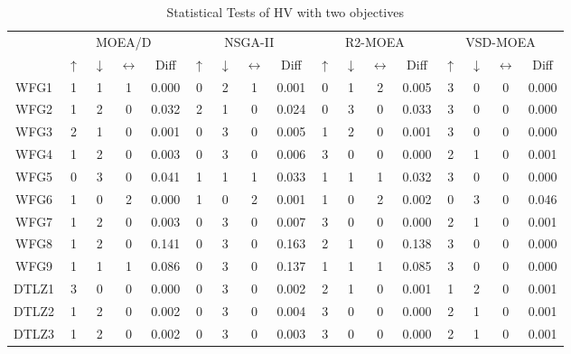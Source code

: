 \begin{table*}[t]
\caption{Statistical Tests of HV with two objectives}
\label{tab:Tests_HV_2obj}
\centering
\begin{tabular}{c|c|c|c|c|c|c|c|c|c|c|c|c|c|c|c|c|}
\cline{2-17}
 & \multicolumn{4}{c|}{MOEA/D} & \multicolumn{4}{c|}{NSGA-II} & \multicolumn{4}{c|}{R2-MOEA} & \multicolumn{4}{c|}{VSD-MOEA} \\ \cline{2-17} 
 & $\uparrow$ & $\downarrow$ & $\leftrightarrow$ & Diff & $\uparrow$ & $\downarrow$ & $\leftrightarrow$ & Diff & $\uparrow$ & $\downarrow$ & $\leftrightarrow$ & Diff & $\uparrow$ & $\downarrow$ & $\leftrightarrow$ & Diff \\ \hline
\multicolumn{1}{|c|}{WFG1} & 1 & 1 & 1 & 0.000 & 0 & 2 & 1 & 0.001 & 0 & 1 & 2 & 0.005 & 3 & 0 & 0 & 0.000 \\ \hline
\multicolumn{1}{|c|}{WFG2} & 1 & 2 & 0 & 0.032 & 2 & 1 & 0 & 0.024 & 0 & 3 & 0 & 0.033 & 3 & 0 & 0 & 0.000 \\ \hline
\multicolumn{1}{|c|}{WFG3} & 2 & 1 & 0 & 0.001 & 0 & 3 & 0 & 0.005 & 1 & 2 & 0 & 0.001 & 3 & 0 & 0 & 0.000 \\ \hline
\multicolumn{1}{|c|}{WFG4} & 1 & 2 & 0 & 0.003 & 0 & 3 & 0 & 0.006 & 3 & 0 & 0 & 0.000 & 2 & 1 & 0 & 0.001 \\ \hline
\multicolumn{1}{|c|}{WFG5} & 0 & 3 & 0 & 0.041 & 1 & 1 & 1 & 0.033 & 1 & 1 & 1 & 0.032 & 3 & 0 & 0 & 0.000 \\ \hline
\multicolumn{1}{|c|}{WFG6} & 1 & 0 & 2 & 0.000 & 1 & 0 & 2 & 0.001 & 1 & 0 & 2 & 0.002 & 0 & 3 & 0 & 0.046 \\ \hline
\multicolumn{1}{|c|}{WFG7} & 1 & 2 & 0 & 0.003 & 0 & 3 & 0 & 0.007 & 3 & 0 & 0 & 0.000 & 2 & 1 & 0 & 0.001 \\ \hline
\multicolumn{1}{|c|}{WFG8} & 1 & 2 & 0 & 0.141 & 0 & 3 & 0 & 0.163 & 2 & 1 & 0 & 0.138 & 3 & 0 & 0 & 0.000 \\ \hline
\multicolumn{1}{|c|}{WFG9} & 1 & 1 & 1 & 0.086 & 0 & 3 & 0 & 0.137 & 1 & 1 & 1 & 0.085 & 3 & 0 & 0 & 0.000 \\ \hline
\multicolumn{1}{|c|}{DTLZ1} & 3 & 0 & 0 & 0.000 & 0 & 3 & 0 & 0.002 & 2 & 1 & 0 & 0.001 & 1 & 2 & 0 & 0.001 \\ \hline
\multicolumn{1}{|c|}{DTLZ2} & 1 & 2 & 0 & 0.002 & 0 & 3 & 0 & 0.004 & 3 & 0 & 0 & 0.000 & 2 & 1 & 0 & 0.001 \\ \hline
\multicolumn{1}{|c|}{DTLZ3} & 1 & 2 & 0 & 0.002 & 0 & 3 & 0 & 0.003 & 3 & 0 & 0 & 0.000 & 2 & 1 & 0 & 0.001 \\ \hline

\end{tabular}
\end{table*}
